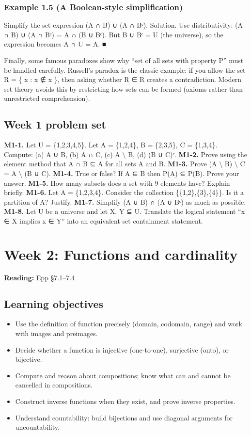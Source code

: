 \documentclass[11pt]{article}
\begin{document}
\subsubsection*{Example 1.5 (A Boolean-style simplification)}
Simplify the set expression (A ∩ B) ∪ (A ∩ Bᶜ).
Solution. Use distributivity:
(A ∩ B) ∪ (A ∩ Bᶜ) = A ∩ (B ∪ Bᶜ).
But B ∪ Bᶜ = U (the universe), so the expression becomes A ∩ U = A. ■

Finally, some famous paradoxes show why “set of all sets with property P” must be
handled carefully. Russell’s paradox is the classic example: if you allow the set R = \{ x : x
∉ x \}, then asking whether R ∈ R creates a contradiction. Modern set theory avoids this
by restricting how sets can be formed (axioms rather than unrestricted comprehension).
\subsection*{Week 1 problem set}
\textbf{M1-1.} Let U = \{1,2,3,4,5\}. Let A = \{1,2,4\}, B = \{2,3,5\}, C = \{1,3,4\}. Compute: (a) A ∪
B, (b) A ∩ C, (c) A \(\setminus\) B, (d) (B ∪ C)ᶜ.
\textbf{M1-2.} Prove using the element method that A ∩ B ⊆ A for all sets A and B.
\textbf{M1-3.} Prove (A \(\setminus\) B) \(\setminus\) C = A \(\setminus\) (B ∪ C).
\textbf{M1-4.} True or false? If A ⊆ B then P(A) ⊆ P(B). Prove your answer.
\textbf{M1-5.} How many subsets does a set with 9 elements have? Explain briefly.
\textbf{M1-6.} Let A = \{1,2,3,4\}. Consider the collection \{\{1,2\},\{3\},\{4\}\}. Is it a partition of A?
Justify.
\textbf{M1-7.} Simplify (A ∪ B) ∩ (A ∪ Bᶜ) as much as possible.
\textbf{M1-8.} Let U be a universe and let X, Y ⊆ U. Translate the logical statement “x ∈ X
implies x ∈ Y” into an equivalent set containment statement.

\clearpage
\section{Week 2: Functions and cardinality}
\textbf{Reading:} Epp §7.1–7.4
\subsection*{Learning objectives}
\begin{itemize}[leftmargin=*,itemsep=0.25em]
\item Use the definition of function precisely (domain, codomain, range) and work with images and preimages.
\item Decide whether a function is injective (one-to-one), surjective (onto), or bijective.
\item Compute and reason about compositions; know what can and cannot be cancelled in compositions.
\item Construct inverse functions when they exist, and prove inverse properties.
\item Understand countability: build bijections and use diagonal arguments for uncountability.
\end{itemize}
\end{document}
